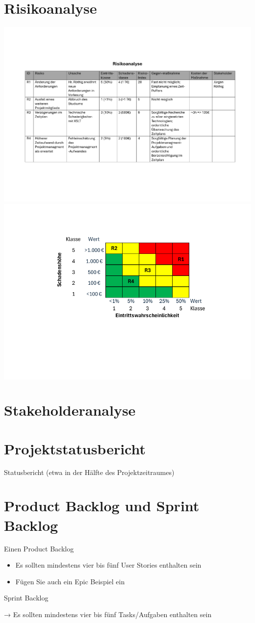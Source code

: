 \documentclass[12pt]{article}
\begin{document}
\section{Risikoanalyse}
\includegraphics[width=\textwidth]{Planungsdokumente/graphics/Risikoanalyse.pdf}
\includegraphics[width=\textwidth]{Planungsdokumente/graphics/Risikomatrix.pdf}

\section{Stakeholderanalyse}

\section{Projektstatusbericht}
Statusbericht (etwa in der Hälfte des Projektzeitraumes)

\section{Product Backlog und Sprint Backlog}
Einen Product Backlog
\begin{itemize}
	\item Es sollten mindestens vier bis fünf User Stories enthalten sein
	\item Fügen Sie auch ein Epic Beispiel ein
\end{itemize}
Sprint Backlog

→ Es sollten mindestens vier bis fünf Tasks/Aufgaben enthalten sein
\end{document}
